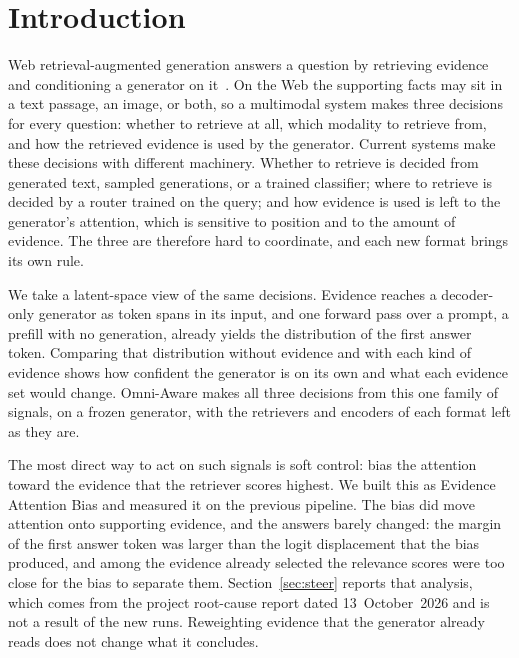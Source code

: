 \documentclass[sigconf,anonymous,review]{acmart}
\newcommand{\method}{Omni-Aware}
\begin{document}

\maketitle

\section{Introduction}
\label{sec:intro}

Web retrieval-augmented generation answers a question by retrieving evidence and conditioning a generator on it~\cite{guu2020realm,lewis2020rag}.
On the Web the supporting facts may sit in a text passage, an image, or both, so a multimodal system makes three decisions for every question: whether to retrieve at all, which modality to retrieve from, and how the retrieved evidence is used by the generator.
Current systems make these decisions with different machinery.
Whether to retrieve is decided from generated text, sampled generations, or a trained classifier; where to retrieve is decided by a router trained on the query; and how evidence is used is left to the generator's attention, which is sensitive to position and to the amount of evidence.
The three are therefore hard to coordinate, and each new format brings its own rule.

We take a latent-space view of the same decisions.
Evidence reaches a decoder-only generator as token spans in its input, and one forward pass over a prompt, a prefill with no generation, already yields the distribution of the first answer token.
Comparing that distribution without evidence and with each kind of evidence shows how confident the generator is on its own and what each evidence set would change.
\method{} makes all three decisions from this one family of signals, on a frozen generator, with the retrievers and encoders of each format left as they are.

The most direct way to act on such signals is soft control: bias the attention toward the evidence that the retriever scores highest.
We built this as Evidence Attention Bias and measured it on the previous pipeline.
The bias did move attention onto supporting evidence, and the answers barely changed: the margin of the first answer token was larger than the logit displacement that the bias produced, and among the evidence already selected the relevance scores were too close for the bias to separate them.
Section~\ref{sec:steer} reports that analysis, which comes from the project root-cause report dated 13~October~2026 and is not a result of the new runs.
Reweighting evidence that the generator already reads does not change what it concludes.
\end{document}
